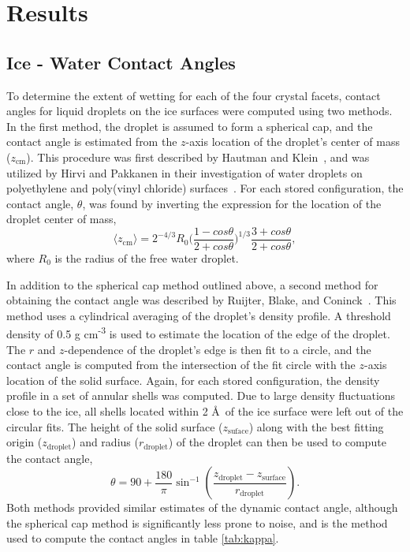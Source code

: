 \section{Results}
\subsection{Ice - Water Contact Angles}
To determine the extent of wetting for each of the four crystal
facets, contact angles for liquid droplets on the ice surfaces were
computed using two methods.  In the first method, the droplet is
assumed to form a spherical cap, and the contact angle is estimated
from the $z$-axis location of the droplet's center of mass
($z_\mathrm{cm}$).  This procedure was first described by Hautman and
Klein~\cite{Hautman91}, and was utilized by Hirvi and Pakkanen in
their investigation of water droplets on polyethylene and poly(vinyl
chloride) surfaces~\cite{Hirvi06}. For each stored configuration, the
contact angle, $\theta$, was found by inverting the expression for the
location of the droplet center of mass,
\begin{equation}\label{contact_1}
\langle z_\mathrm{cm}\rangle = 2^{-4/3}R_{0}\bigg(\frac{1-cos\theta}{2+cos\theta}\bigg)^{1/3}\frac{3+cos\theta}{2+cos\theta} ,
\end{equation}
where $R_{0}$ is the radius of the free water droplet. 

In addition to the spherical cap method outlined above, a second
method for obtaining the contact angle was described by Ruijter,
Blake, and Coninck~\cite{Ruijter99}.  This method uses a cylindrical
averaging of the droplet's density profile.  A threshold density of
0.5 g cm\textsuperscript{-3} is used to estimate the location of the
edge of the droplet.  The $r$ and $z$-dependence of the droplet's edge
is then fit to a circle, and the contact angle is computed from the
intersection of the fit circle with the $z$-axis location of the solid
surface.  Again, for each stored configuration, the density profile in
a set of annular shells was computed. Due to large density
fluctuations close to the ice, all shells located within 2 \AA\ of the
ice surface were left out of the circular fits.  The height of the
solid surface ($z_\mathrm{suface}$) along with the best fitting origin
($z_\mathrm{droplet}$) and radius ($r_\mathrm{droplet}$) of the
droplet can then be used to compute the contact angle,
\begin{equation}
\theta =  90 + \frac{180}{\pi} \sin^{-1}\left(\frac{z_\mathrm{droplet} -
  z_\mathrm{surface}}{r_\mathrm{droplet}} \right).
\end{equation}
Both methods provided similar estimates of the dynamic contact angle,
although the spherical cap method is significantly less prone to
noise, and is the method used to compute the contact angles in table
\ref{tab:kappa}.

